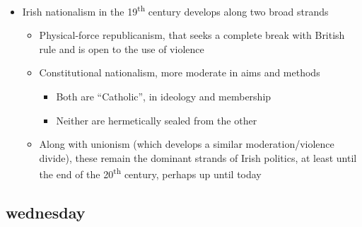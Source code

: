 \documentclass[12pt]{article}
\def\th{\textsuperscript{th}}
\begin{document}
\begin{itemize}
\begin{itemize}
\begin{itemize}
                    \end{itemize}
                \end{itemize}
                \item Irish nationalism in the 19\th{} century develops along two broad strands
                \begin{itemize}
                    \item Physical-force republicanism, that seeks a complete break with British rule and is open to the use of violence
                    \item Constitutional nationalism, more moderate in aims and methods
                    \begin{itemize}
                        \item Both are ``Catholic'', in ideology and membership
                        \item Neither are hermetically sealed from the other
                    \end{itemize}
                    \item Along with unionism (which develops a similar moderation/violence divide), these remain the dominant strands of Irish politics, at least until the end of the 20\th{} century, perhaps up until today
                \end{itemize}
            \end{itemize}
            \newpage
        \subsection{wednesday}
\end{document}
